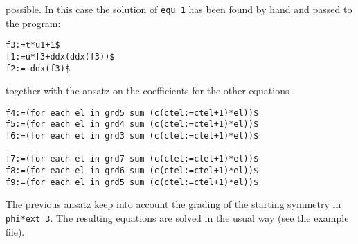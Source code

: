 possible. In this case the solution of \texttt{equ 1} has been found by hand
and passed to the program:
\begin{verbatim}
f3:=t*u1+1$
f1:=u*f3+ddx(ddx(f3))$
f2:=-ddx(f3)$
\end{verbatim}
together with the ansatz on the coefficients for the other equations
\begin{verbatim}
f4:=(for each el in grd5 sum (c(ctel:=ctel+1)*el))$
f5:=(for each el in grd4 sum (c(ctel:=ctel+1)*el))$
f6:=(for each el in grd3 sum (c(ctel:=ctel+1)*el))$

f7:=(for each el in grd7 sum (c(ctel:=ctel+1)*el))$
f8:=(for each el in grd6 sum (c(ctel:=ctel+1)*el))$
f9:=(for each el in grd5 sum (c(ctel:=ctel+1)*el))$
\end{verbatim}
The previous ansatz keep into account the grading of the starting
symmetry in \texttt{phi*ext 3}. The resulting equations are solved in the usual
way (see the example file).


